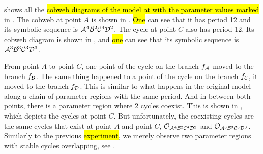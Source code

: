  shows all the \hl{cobweb diagrams of the model at with the parameter values marked} in .
The cobweb at point $A$ is shown in .
\hl{One} can see that it has period 12 and its symbolic sequence is $\mathcal{A}^4\mathcal{B}^2\mathcal{C}^4\mathcal{D}^2$.
The cycle at point $C$ also has period 12.
Its cobweb diagram is shown in , and \hl{one} can see that its symbolic sequence is $\mathcal{A}^3\mathcal{B}^3\mathcal{C}^3\mathcal{D}^3$.

From point $A$ to point $C$, one point of the cycle on the branch $f_{\mathcal{A}}$ moved to the branch $f_{\mathcal{B}}$.
The same thing happened to a point of the cycle on the branch $f_{\mathcal{C}}$, it moved to the branch $f_{\mathcal{D}}$.
This is similar to what happens in the original model along a chain of parameter regions with the same period.
And in between both points, there is a parameter region where 2 cycles coexist.
This is shown in , which depicts the cycles at point $C$.
But unfortunately, the coexisting cycles are the same cycles that exist at point $A$ and point $C$, $\mathcal{O}_{\mathcal{A}^4\mathcal{B}^2\mathcal{C}^4\mathcal{D}^2}$ and $\mathcal{O}_{\mathcal{A}^3\mathcal{B}^3\mathcal{C}^3\mathcal{D}^3}$.
Similarly to the previous \hl{experiment}, we merely observe two parameter regions with stable cycles overlapping, see .
